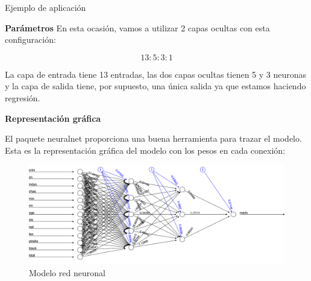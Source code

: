 \documentclass[
  ignorenonframetext,
]{beamer}
\newenvironment{Shaded}{\begin{snugshade}}{\end{snugshade}}
\newcommand{\CommentTok}[1]{\textcolor[rgb]{0.56,0.35,0.01}{\textit{#1}}}
\newcommand{\DataTypeTok}[1]{\textcolor[rgb]{0.13,0.29,0.53}{#1}}
\newcommand{\DecValTok}[1]{\textcolor[rgb]{0.00,0.00,0.81}{#1}}
\newcommand{\KeywordTok}[1]{\textcolor[rgb]{0.13,0.29,0.53}{\textbf{#1}}}
\newcommand{\NormalTok}[1]{#1}
\newcommand{\OperatorTok}[1]{\textcolor[rgb]{0.81,0.36,0.00}{\textbf{#1}}}
\newcommand{\StringTok}[1]{\textcolor[rgb]{0.31,0.60,0.02}{#1}}
\begin{document}
\begin{frame}[fragile]{Ejemplo de aplicación}
\begin{block}{\textbf{Parámetros}}
En esta ocasión, vamos a utilizar 2 capas ocultas con esta
configuración:

\[13: 5: 3: 1\]

La capa de entrada tiene 13 entradas, las dos capas ocultas tienen 5 y 3
neuronas y la capa de salida tiene, por supuesto, una única salida ya
que estamos haciendo regresión.

\begin{Shaded}
\end{Shaded}

\end{block}

\begin{block}{\textbf{Representación gráfica}}

El paquete neuralnet proporciona una buena herramienta para trazar el
modelo. Esta es la representación gráfica del modelo con los pesos en
cada conexión:

\begin{figure}
\centering
\includegraphics[width=9.375in,height=\textheight]{5.png}
\caption{Modelo red neuronal}
\end{figure}

\end{block}


\end{frame}
\end{document}
